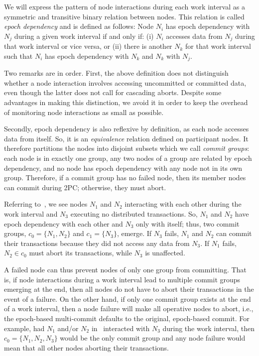 We will express the pattern of node interactions during each work interval as a symmetric and transitive 
binary relation between nodes. This relation is called \emph{epoch dependency} and is defined as follows: 
Node $N_i$ has epoch dependency with $N_j$ during a given work interval if and only if: (i) $N_i$ accesses 
data from $N_j$ during that work interval or vice versa, or (ii) there is another $N_k$ for that work 
interval such that $N_i$ has epoch dependency with $N_k$ and $N_k$ 
with $N_j$. 

Two remarks are in order. First, the above definition does not distinguish whether a node interaction 
involves accessing uncommitted or committed data, even though the latter does not call for cascading aborts. 
Despite some advantages in making this distinction, we avoid it in order to keep the overhead of monitoring 
node interactions as small as possible.  

Secondly, epoch dependency is also reflexive by definition, as each node accesses data from itself. So, it 
is an \emph{equivalence} relation defined on participant nodes. It therefore partitions the nodes into 
disjoint subsets which we call \emph{commit groups}: each node is in exactly one group, any two nodes of a 
group are related by epoch dependency, and no node has epoch dependency with any node not in its own group. 
Therefore, if a commit group has no failed node, then its member nodes can commit during 2PC; otherwise, they 
must abort. 

Referring to~, we see nodes $N_1$ and $N_2$ interacting with each other during the work 
interval and $N_3$ executing no distributed transactions. So, $N_1$ and $N_2$ have epoch dependency with each 
other and $N_3$ only with itself; thus, two commit groups, $c_0 = \{N_1 , N_2 \}$ and $c_1 = \{N_3 \}$, 
emerge.
If $N_3$ fails, $N_1$ and $N_2$ can commit their transactions because they did not access any data from $N_3$.
If $N_1$ fails, $N_2 \in c_0$ must abort its transactions, while $N_3$ is unaffected.

A failed node can thus prevent nodes of only one group from committing. That is, if node interactions during 
a work interval lead to multiple commit groups emerging at the end, then all nodes do not have to abort their 
transactions in the event of a failure. On the other hand, if only one commit group exists at the end of a 
work interval, then a node failure will make all operative nodes to abort, i.e., the epoch-based multi-commit 
defaults to the original, epoch-based commit. For example, had $N_1$ and/or $N_2$ in~ 
interacted with $N_3$ during the work interval, then $c_0 = \{N_1 , N_2 , N_3 \}$ would be the only commit 
group and any node failure would mean that all other nodes aborting their transactions.

